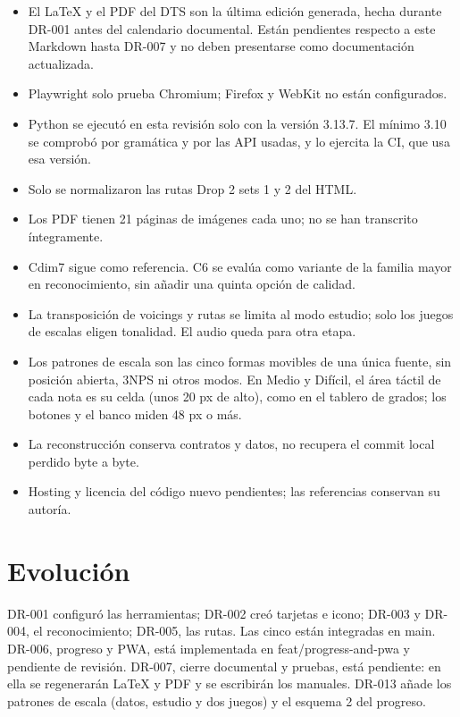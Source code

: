 \documentclass[a4paper,11pt]{article}
\begin{document}
\begin{itemize}
  tarjetas; hasta entonces el texto usa una fuente de respaldo.
\item
  El LaTeX y el PDF del DTS son la última edición generada, hecha
  durante DR-001 antes del calendario documental. Están pendientes
  respecto a este Markdown hasta DR-007 y no deben presentarse como
  documentación actualizada.
\item
  Playwright solo prueba Chromium; Firefox y WebKit no están
  configurados.
\item
  Python se ejecutó en esta revisión solo con la versión 3.13.7. El
  mínimo 3.10 se comprobó por gramática y por las API usadas, y lo
  ejercita la CI, que usa esa versión.
\item
  Solo se normalizaron las rutas Drop 2 sets 1 y 2 del HTML.
\item
  Los PDF tienen 21 páginas de imágenes cada uno; no se han transcrito
  íntegramente.
\item
  Cdim7 sigue como referencia. C6 se evalúa como variante de la familia
  mayor en reconocimiento, sin añadir una quinta opción de calidad.
\item
  La transposición de voicings y rutas se limita al modo estudio; solo
  los juegos de escalas eligen tonalidad. El audio queda para otra
  etapa.
\item
  Los patrones de escala son las cinco formas movibles de una única
  fuente, sin posición abierta, 3NPS ni otros modos. En Medio y Difícil,
  el área táctil de cada nota es su celda (unos 20 px de alto), como en
  el tablero de grados; los botones y el banco miden 48 px o más.
\item
  La reconstrucción conserva contratos y datos, no recupera el commit
  local perdido byte a byte.
\item
  Hosting y licencia del código nuevo pendientes; las referencias
  conservan su autoría.
\end{itemize}

\Needspace{4cm}
\section{Evolución}\label{evoluciuxf3n}

DR-001 configuró las herramientas; DR-002 creó tarjetas e icono; DR-003
y DR-004, el reconocimiento; DR-005, las rutas. Las cinco están
integradas en main. DR-006, progreso y PWA, está implementada en
feat/progress-and-pwa y pendiente de revisión. DR-007, cierre documental
y pruebas, está pendiente: en ella se regenerarán LaTeX y PDF y se
escribirán los manuales. DR-013 añade los patrones de escala (datos,
estudio y dos juegos) y el esquema 2 del progreso.
\end{document}

